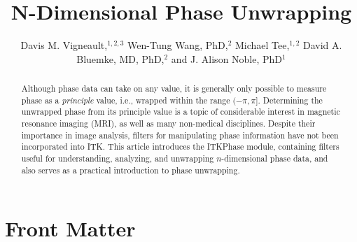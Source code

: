 \documentclass{InsightArticle}
\title{N-Dimensional Phase Unwrapping}
\author{Davis M. Vigneault,$^{1,2,3}$ Wen-Tung Wang, PhD,$^{2}$ Michael Tee,$^{1,2}$ David A. Bluemke, MD, PhD,$^{2}$ and J. Alison Noble, PhD$^{1}$}
\newcommand{\IJhandlerIDnumber}{xxxx}
\begin{document}
%
%
\IJhandlefooter{\IJhandlerIDnumber}


\ifpdf
\else
\fi


\maketitle


\ifhtml
\chapter*{Front Matter\label{front}}
\fi

\begin{abstract}

\noindent

Although phase data can take on any value, it is generally only possible to measure phase as a \emph{principle} value, i.e., wrapped within the range $(-\pi, \pi]$.  Determining the unwrapped phase from its principle value is a topic of considerable interest in magnetic resonance imaging (MRI), as well as many non-medical disciplines.  Despite their importance in image analysis, filters for manipulating phase information have not been incorporated into ITK.  This article introduces the ITKPhase module, containing filters useful for understanding, analyzing, and unwrapping $n$-dimensional phase data, and also serves as a practical introduction to phase unwrapping.

\end{abstract}

\IJhandlenote{\IJhandlerIDnumber}

\tableofcontents
\clearpage

\clearpage

\clearpage

\clearpage

\clearpage

\clearpage


%
%



\end{document}
